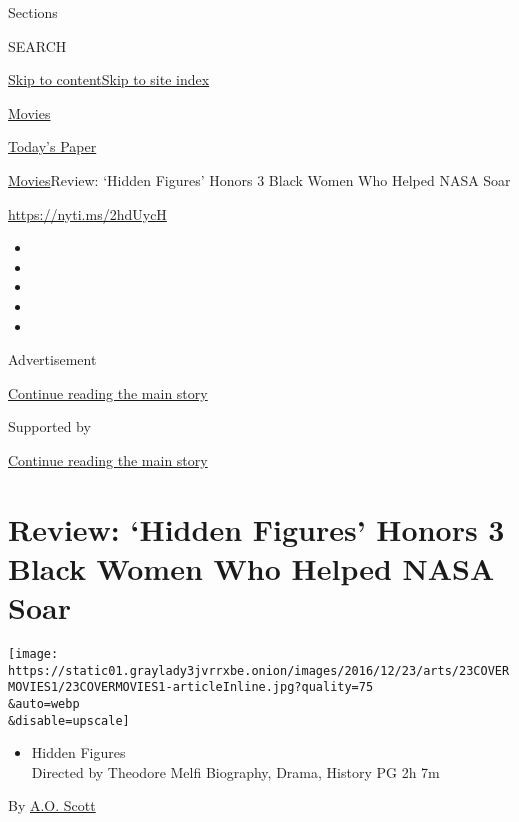 Sections

SEARCH

\protect\hyperlink{site-content}{Skip to
content}\protect\hyperlink{site-index}{Skip to site index}

\href{https://www.nytimes3xbfgragh.onion/section/movies}{Movies}

\href{https://myaccount.nytimes3xbfgragh.onion/auth/login?response_type=cookie\&client_id=vi}{}

\href{https://www.nytimes3xbfgragh.onion/section/todayspaper}{Today's
Paper}

\href{/section/movies}{Movies}\textbar{}Review: `Hidden Figures' Honors
3 Black Women Who Helped NASA Soar

\url{https://nyti.ms/2hdUycH}

\begin{itemize}
\item
\item
\item
\item
\item
\end{itemize}

Advertisement

\protect\hyperlink{after-top}{Continue reading the main story}

Supported by

\protect\hyperlink{after-sponsor}{Continue reading the main story}

\hypertarget{review-hidden-figures-honors-3-black-women-who-helped-nasa-soar}{%
\section{Review: `Hidden Figures' Honors 3 Black Women Who Helped NASA
Soar}\label{review-hidden-figures-honors-3-black-women-who-helped-nasa-soar}}

\texttt{[image: https://static01.graylady3jvrrxbe.onion/images/2016/12/23/arts/23COVERMOVIES1/23COVERMOVIES1-articleInline.jpg?quality=75\\\&auto=webp\\\&disable=upscale]}

\begin{itemize}
\tightlist
\item
  Hidden Figures\\
  Directed by Theodore Melfi Biography, Drama, History PG 2h 7m
\end{itemize}

By \href{https://www.nytimes3xbfgragh.onion/by/a-o--scott}{A.O. Scott}

